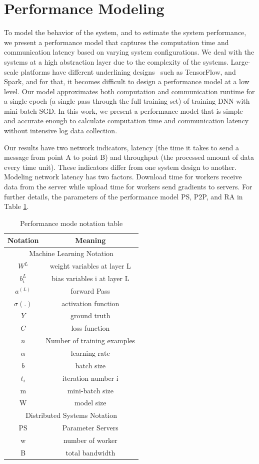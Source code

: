 \documentclass[conference]{IEEEtran}
\begin{document}
\section{Performance Modeling}
\label{sec:permodel}

To model the behavior of the system, and to estimate the system performance, we present a performance model that captures the computation time and communication latency based on varying system configurations. We deal with the systems at a high abstraction layer due to the complexity of the systems. Large-scale platforms have different underlining designs~\cite{KUO1} such as TensorFlow, and Spark, and for that, it becomes difficult to design a performance model at a low level. Our model approximates both computation and communication runtime for a single epoch (a single pass through the full training set) of training DNN with mini-batch SGD. In this work, we present a performance model that is simple and accurate enough to calculate computation time and communication latency without intensive log data collection. 

Our results have two network indicators, latency (the time it takes to send a message from point A to point B) and throughput (the processed amount of data every time unit). These indicators differ from one system design to another. Modeling network latency has two factors. Download time for workers receive data from the server while upload time for workers send gradients to servers. For further details, the parameters of the performance model PS, P2P, and RA in Table \ref{table:1}.

\begin{table}[h!]
\centering
\begin{tabular}{c c} 
\hline\hline 
Notation & Meaning \\ 
\hline\hline
\multicolumn{2}{c}{Machine Learning Notation} \\
\hline
$W^{L}$ & weight variables at layer L\\
$b^{L}_{i}$ & bias variables i at layer L \\
$a^{(L)}$ & forward Pass\\
$\sigma(.)$ & activation function \\
$Y$ & ground truth \\
$C$ & loss function \\
$n$ & Number of training examples\\
$\alpha$ & learning rate \\
$b$ & batch size\\
$t_{i}$ & iteration number i \\
m & mini-batch size \\
W & model size \\
\hline\hline
\multicolumn{2}{c}{Distributed Systems Notation} \\
\hline\hline
PS & Parameter Servers\\
w & number of worker \\
B & total bandwidth \\
\hline
\end{tabular}
\caption{Performance mode notation table}
\label{table:1}
\end{table}
\end{document}
